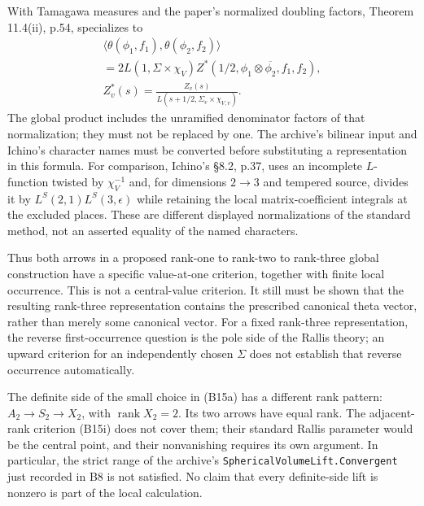 With Tamagawa measures and the paper's normalized doubling factors, Theorem 11.4(ii), p.54, specializes to
\begin{equation}
\begin{gathered}
 \langle\theta(\phi_1,f_1),\theta(\phi_2,f_2)\rangle
 \\
 =2L(1,\Sigma\times\chi_V)
       Z^*(1/2,\phi_1\otimes\overline{\phi_2},f_1,f_2),
 \\
 Z_v^*(s)=\frac{Z_v(s)}{L(s+1/2,\Sigma_v\times\chi_{V,v})}.
\end{gathered}
 \tag{B15j}
\end{equation}
The global product includes the unramified denominator factors of that normalization; they must not be replaced by one. The archive's bilinear input and Ichino's character names must be converted before substituting a representation in this formula. For comparison, Ichino's \S8.2, p.37, uses an incomplete $L$-function twisted by $\chi_V^{-1}$ and, for dimensions $2\to3$ and tempered source, divides it by $L^S(2,1)L^S(3,\epsilon)$ while retaining the local matrix-coefficient integrals at the excluded places. These are different displayed normalizations of the standard method, not an asserted equality of the named characters.

Thus both arrows in a proposed rank-one to rank-two to rank-three global construction have a specific value-at-one criterion, together with finite local occurrence. This is not a central-value criterion. It still must be shown that the resulting rank-three representation contains the prescribed canonical theta vector, rather than merely some canonical vector. For a fixed rank-three representation, the reverse first-occurrence question is the pole side of the Rallis theory; an upward criterion for an independently chosen $\Sigma$ does not establish that reverse occurrence automatically.

The definite side of the small choice in (B15a) has a different rank pattern: $A_2\to S_2\to X_2$, with $\operatorname{rank}X_2=2$. Its two arrows have equal rank. The adjacent-rank criterion (B15i) does not cover them; their standard Rallis parameter would be the central point, and their nonvanishing requires its own argument. In particular, the strict range of the archive's \texttt{SphericalVolumeLift.Convergent} just recorded in B8 is not satisfied. No claim that every definite-side lift is nonzero is part of the local calculation.

